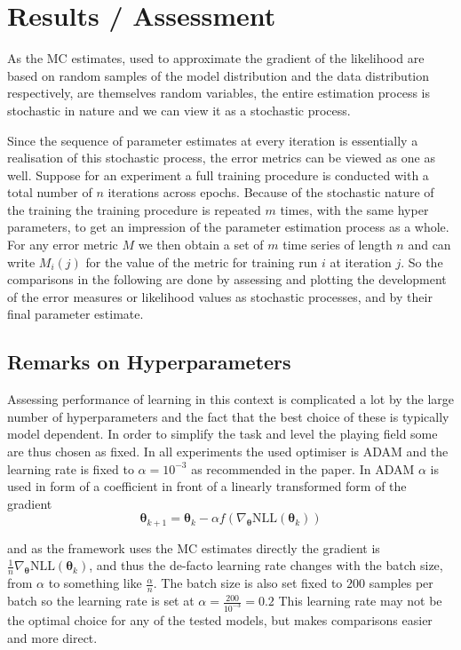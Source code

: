 
\section{Results / Assessment}

As the MC estimates, used to approximate the gradient of the likelihood are based on random samples of the model distribution and the data distribution respectively,
are themselves random variables, the entire estimation process is stochastic in nature and we can view it as a stochastic process.

Since the sequence of parameter estimates at every iteration is essentially a realisation of this stochastic process, the error metrics can be viewed as one as well.
Suppose for an experiment a full training procedure is conducted with a total number of $n$ iterations across epochs.
Because of the stochastic nature of the training the training procedure is repeated $m$ times, with the same hyper parameters, 
to get an impression of the parameter estimation process as a whole.
For any error metric $M$ we then obtain a set of $m$ time series of length $n$ and can write $M_i (j)$ for the value of the metric for training run $i$ at iteration $j$.
So the comparisons in the following are done by assessing and plotting the development of the error measures or likelihood values as stochastic processes,
and by their final parameter estimate.


\subsection{Remarks on Hyperparameters}

Assessing performance of learning in this context is complicated a lot by the large number of hyperparameters 
and the fact that the best choice of these is typically model dependent.
In order to simplify the task and level the playing field some are thus chosen as fixed.
In all experiments the used optimiser is ADAM \cite{Kingma2014AdamAM} and the learning rate is fixed to $\alpha = 10^{-3}$ as recommended in the paper.
In ADAM $\alpha$ is used in form of a coefficient in front of a linearly transformed form of the gradient
\[
	\bm{\theta}_{k+1} = \bm{\theta}_k - \alpha f( \nabla_{\bm{\theta}} \text{NLL}(\bm{\theta}_k) )
\]

and as the framework uses the MC estimates directly the gradient is $\frac{1}{n} \nabla_{\bm{\theta}} \text{NLL}(\bm{\theta}_k)$, 
and thus the de-facto learning rate changes with the batch size, from $\alpha$ to something like $\frac{\alpha}{n}$.
The batch size is also set fixed to $200$ samples per batch so the learning rate is set at $\alpha = \frac{200}{10^{-3}} = 0.2$
This learning rate may not be the optimal choice for any of the tested models, but makes comparisons easier and more direct.

